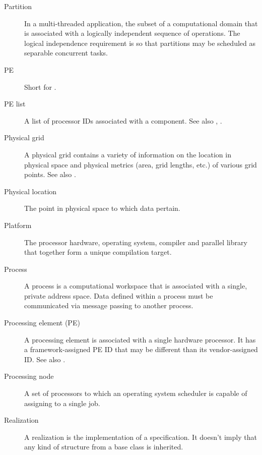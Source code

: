 \begin{description}
\item[Partition] \label{glos:Partition} In a multi-threaded application, the subset of a
  computational domain that is associated with a logically independent
  sequence of operations. The logical independence requirement is so
  that partitions may be scheduled as separable concurrent tasks.

\item[PE] \label{glos:PE} Short for .

\item[PE list] \label{glos:PEList} A list of processor IDs associated 
  with a component.  See also , .

\item[Physical grid] \label{term:PhysGrid} 
  A physical grid contains a variety of information on the location 
  in physical space and physical metrics (area, grid lengths, etc.) 
  of various grid points. See also . 

\item[Physical location] \label{glos:PhysLoc} The point in physical space 
  to which data pertain. 

\item[Platform] \label{glos:Platform} 
  The processor hardware, operating system, compiler and
  parallel library that together form a unique compilation target.

\item[Process] \label{glos:Process}
  A process is a computational workspace that is associated with a single,
  private address space. Data defined within a process must be communicated
  via message passing to another process.

\item[Processing element (PE)] \label{glos:Processing_Element}
  A processing element is associated with a single hardware processor.  It 
  has a framework-assigned PE ID that may be different than its 
  vendor-assigned ID.
  See also .  

\item[Processing node] \label{glos:Pnode} A set of processors to which an
  operating system scheduler is capable of assigning to a single job.

\item[Realization] \label{glos:Realization} A realization is the 
  implementation of a specification.  It doesn't imply that any kind
  of structure from a base class is inherited.


\end{description}
